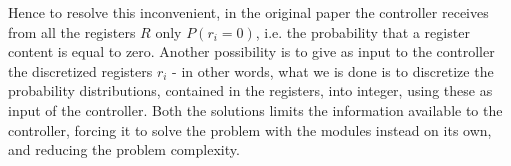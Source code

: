 Hence to resolve this inconvenient, in the original paper the controller receives from all the registers $R$ only $P(r_{i} = 0)$, i.e. the probability that a register content is equal to zero. Another possibility  is to give as input to the controller the discretized registers $r_{i}$ - in other words, what we is done is to discretize the probability distributions, contained in the registers, into integer, using these as input of the controller. Both the solutions limits the information available to the controller, forcing it to solve the problem with the modules instead on its own, and reducing the problem complexity.


